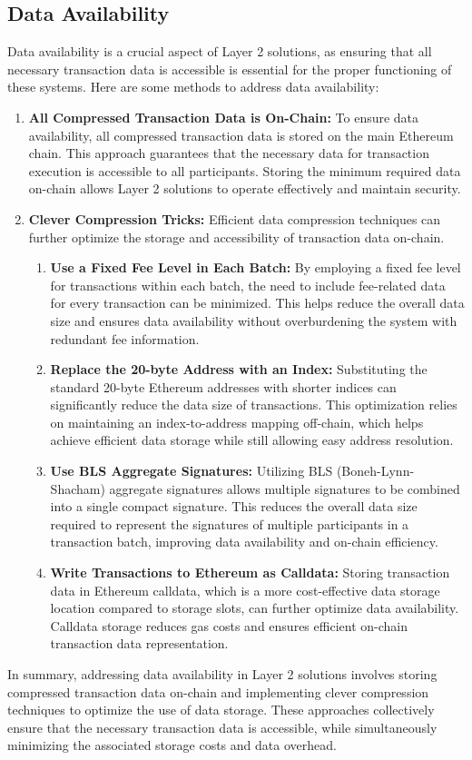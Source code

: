 \documentclass{report}
\begin{document}
\subsection{Data Availability}
Data availability is a crucial aspect of Layer 2 solutions, as ensuring that all necessary transaction data is accessible is essential for the proper functioning of these systems. Here are some methods to address data availability:
\begin{enumerate}
	\item \textbf{All Compressed Transaction Data is On-Chain:} To ensure data availability, all compressed transaction data is stored on the main Ethereum chain. This approach guarantees that the necessary data for transaction execution is accessible to all participants. Storing the minimum required data on-chain allows Layer 2 solutions to operate effectively and maintain security.
	\item \textbf{Clever Compression Tricks:} Efficient data compression techniques can further optimize the storage and accessibility of transaction data on-chain.
	\begin{enumerate}
		\item \textbf{Use a Fixed Fee Level in Each Batch:} By employing a fixed fee level for transactions within each batch, the need to include fee-related data for every transaction can be minimized. This helps reduce the overall data size and ensures data availability without overburdening the system with redundant fee information.
		\item \textbf{Replace the 20-byte Address with an Index:} Substituting the standard 20-byte Ethereum addresses with shorter indices can significantly reduce the data size of transactions. This optimization relies on maintaining an index-to-address mapping off-chain, which helps achieve efficient data storage while still allowing easy address resolution.
		\item \textbf{Use BLS Aggregate Signatures:} Utilizing BLS (Boneh-Lynn-Shacham) aggregate signatures allows multiple signatures to be combined into a single compact signature. This reduces the overall data size required to represent the signatures of multiple participants in a transaction batch, improving data availability and on-chain efficiency.
		\item \textbf{Write Transactions to Ethereum as Calldata:} Storing transaction data in Ethereum calldata, which is a more cost-effective data storage location compared to storage slots, can further optimize data availability. Calldata storage reduces gas costs and ensures efficient on-chain transaction data representation.
	\end{enumerate}
\end{enumerate}
In summary, addressing data availability in Layer 2 solutions involves storing compressed transaction data on-chain and implementing clever compression techniques to optimize the use of data storage. These approaches collectively ensure that the necessary transaction data is accessible, while simultaneously minimizing the associated storage costs and data overhead.
\end{document}
